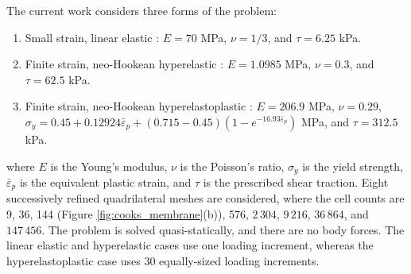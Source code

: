 \documentclass[sn-mathphys,Numbered]{sn-jnl}%
\begin{document}
The current work considers three forms of the problem:
\begin{enumerate}[label=\roman*.]
	\item Small strain, linear elastic \cite{Zienkiewicz2000, Simplas}: $E=70$ MPa, $\nu=1/3$, and $\tau = 6.25$ kPa.
	\item Finite strain, neo-Hookean hyperelastic \cite{Pelteret2018}: $E=1.0985$ MPa, $\nu=0.3$, and $\tau = 62.5$ kPa.
	\item Finite strain, neo-Hookean hyperelastoplastic \citep{Simo1992, Simplas, Cesar2001}: $E=206.9$ MPa, $\nu=0.29$, $\sigma_y = 0.45 + 0.12924\bar{\varepsilon}_p + (0.715 - 0.45)(1- e^{-16.93\bar{\varepsilon}_p})$ MPa, and $\tau = 312.5$ kPa.
\end{enumerate}
where $E$ is the Young's modulus, $\nu$ is the Poisson's ratio, $\sigma_y$ is the yield strength, $\bar{\varepsilon}_p$ is the equivalent plastic strain, and $\tau$ is the prescribed shear traction.
Eight successively refined quadrilateral meshes are considered, where the cell counts are 9, 36, 144 (Figure \ref{fig:cooks_membrane}(b)), 576, $2\,304$, $9\,216$, $36\,864$, and $147\,456$.
The problem is solved quasi-statically, and there are no body forces.
The linear elastic and hyperelastic cases use one loading increment, whereas the hyperelastoplastic case uses 30 equally-sized loading increments.
\end{document}
